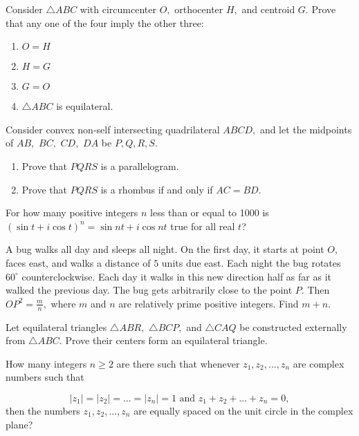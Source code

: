 \documentclass{article}
\begin{document}
\begin{prob}[]{2}
Consider $\triangle ABC$ with circumcenter $O,$ orthocenter $H,$ and centroid $G.$ Prove that any one of the four imply the other three:
    \begin{enumerate}
        \item $O=H$
        \item $H=G$
        \item $G=O$
        \item $\triangle ABC$ is equilateral.
    \end{enumerate}
\end{prob}

\begin{prob}[]{2}
Consider convex non-self intersecting quadrilateral $ABCD,$ and let the midpoints of $AB,$ $BC,$ $CD,$ $DA$ be $P,Q,R,S.$
    \begin{enumerate}
        \item Prove that $PQRS$ is a parallelogram.
        
        \item Prove that $PQRS$ is a rhombus if and only if $AC=BD.$
    \end{enumerate}
\end{prob}
    
\begin{prob}[AIME II 2005/9]{3}
For how many positive integers $n$ less than or equal to 1000 is $(\sin t + i \cos t)^n = \sin nt + i \cos nt$ true for all real $t$?
\end{prob}

\begin{prob}[AIME I 2020/8]{3}
A bug walks all day and sleeps all night. On the first day, it starts at point $O,$ faces east, and walks a distance of $5$ units due east. Each night the bug rotates $60^\circ$ counterclockwise. Each day it walks in this new direction half as far as it walked the previous day. The bug gets arbitrarily close to the point $P.$ Then $OP^2=\tfrac{m}{n},$ where $m$ and $n$ are relatively prime positive integers. Find $m+n.$
\end{prob}

\begin{prob}{3}
Let equilateral triangles $\triangle ABR,$ $\triangle BCP,$ and $\triangle CAQ$ be constructed externally from $\triangle ABC.$ Prove their centers form an equilateral triangle.
\end{prob}

\begin{req}[AMC 12B 2020/23]{3}
How many integers $n \geq 2$ are there such that whenever $z_1, z_2, ..., z_n$ are complex numbers such that

$$|z_1| = |z_2| = ... = |z_n| = 1 \text{    and    } z_1 + z_2 + ... + z_n = 0,$$
then the numbers $z_1, z_2, ..., z_n$ are equally spaced on the unit circle in the complex plane?
\end{req}
\end{document}
